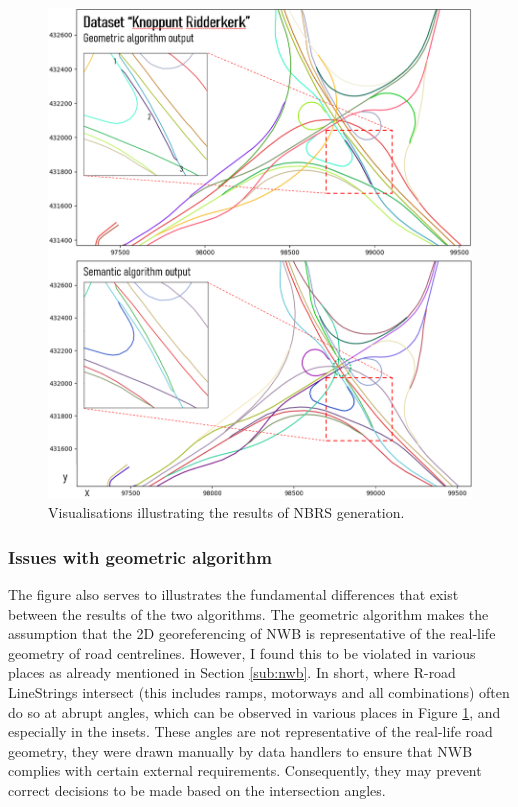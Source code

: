 \begin{figure}
    \centering
    \includegraphics[width=0.9\linewidth]{final_report/figs/nbrsgeneration0.png}
    \caption{Visualisations illustrating the results of NBRS generation.}
    \label{fig:nbrsgeneration0}
\end{figure}

\subsubsection{Issues with geometric algorithm}

The figure also serves to illustrates the fundamental differences that exist between the results of the two algorithms. The geometric algorithm makes the assumption that the 2D georeferencing of NWB is representative of the real-life geometry of road centrelines. However, I found this to be violated in various places as already mentioned in Section \ref{sub:nwb}. In short, where R-road LineStrings intersect (this includes ramps, motorways and all combinations) often do so at abrupt angles, which can be observed in various places in Figure \ref{fig:nbrsgeneration0}, and especially in the insets. These angles are not representative of the real-life road geometry, they were drawn manually by data handlers to ensure that NWB complies with certain external requirements. Consequently, they may prevent correct decisions to be made based on the intersection angles.

